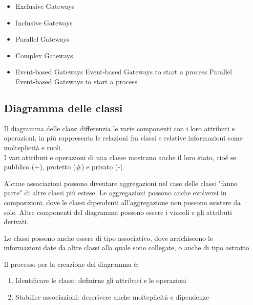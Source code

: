 \documentclass[12pt, a4paper]{article}
\begin{document}
\begin{itemize}
    \item Exclusive Gateways
    \item Inclusive Gateways
    \item Parallel Gateways
    \item Complex Gateways
    \item Event-based Gateways
    \subitem Event-based Gateways to start a process
    \subitem Parallel Event-based Gateways to start a process
\end{itemize}

\newpage
\subsection{Diagramma delle classi}
Il diagramma delle classi differenzia le varie componenti con i loro attributi e operazioni, in più rappresenta 
le relazioni fra classi e relative informazioni come molteplicità e ruoli.\\
I vari attributi e operazioni di una classe mostrano anche il loro stato, cioé se pubblico (+), protetto (\#)
e privato (-).

Alcune associazioni possono diventare aggregazioni nel caso delle classi "fanno parte" di altre classi più estese.
Le aggregazioni possono anche evolversi in composizioni, dove le classi dipendenti all'aggregazione non possono 
esistere da sole. Altre componenti del diagramma possono essere i vincoli e gli attributi derivati. 

Le classi possono anche essere di tipo associativo, dove arrichiscono le informazioni date da altre classi alla 
quale sono collegate, o anche di tipo astratto

Il processo per la creazione del diagramma è:
\begin{enumerate}
    \item Identificare le classi: definirne gli attributi e le operazioni
    \item Stabilire associazioni: descrivere anche molteplicità e dipendenze
\end{enumerate}
\end{document}
